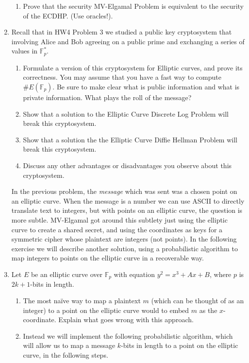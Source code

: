 \documentclass[11pt]{article}
\newcommand{\bF}{\mathbb{F}}
\begin{document}
\begin{enumerate}
{\begin{enumerate}
{    }
    \item{
    Prove that the security MV-Elgamal Problem is equivalent to the security of the ECDHP.  (Use oracles!).
    }
  \end{enumerate}
  }
  \item{
  Recall that in HW4 Problem 3 we studied a public key cryptosystem that involving Alice and Bob agreeing on a public prime and exchanging a series of values in $\bF_p^*$.
  \begin{enumerate}
    \item{
    Formulate a version of this cryptosystem for Elliptic curves, and prove its correctness.  You may assume that you have a fast way to compute $\#E(\bF_p)$. Be sure to make clear what is public information and what is private information.  What plays the roll of the message?
    }
    \item{
    Show that a solution to the Elliptic Curve Discrete Log Problem will break this cryptosystem.
    }
    \item{
    Show that a solution the the Elliptic Curve Diffie Hellman Problem will break this cryptosystem.
    }
    \item{
    Discuss any other advantages or disadvantages you observe about this cryptosystem.
    }
  \end{enumerate}
  }
  In the previous problem, the \textit{message} which was sent was a chosen point on an elliptic curve.  When the message is a number we can use ASCII to directly translate text to integers, but with points on an elliptic curve, the question is more subtle.  MV-Elgamal got around this subtlety just using the elliptic curve to create a shared secret, and using the coordinates as keys for a symmetric cipher whose plaintext are integers (not points).  In the following exercise we will describe another solution, using a probabilistic algorithm to map integers to points on the elliptic curve in a recoverable way.
  \item{
  Let $E$ be an elliptic curve over $\bF_p$ with equation $y^2 = x^3 + Ax + B$, where $p$ is $2k+1$-bits in length.
  \begin{enumerate}
    \item{
    The most na\"ive way to map a plaintext $m$ (which can be thought of as an integer) to a point on the elliptic curve would to embed $m$ as the $x$-coordinate.  Explain what goes wrong with this approach.
    }
    \item{
    Instead we will implement the following probabilistic algorithm, which will allow us to map a message $k$-bits in length to a point on the elliptic curve, in the following steps.
}
\end{enumerate}}
\end{enumerate}
\end{document}
